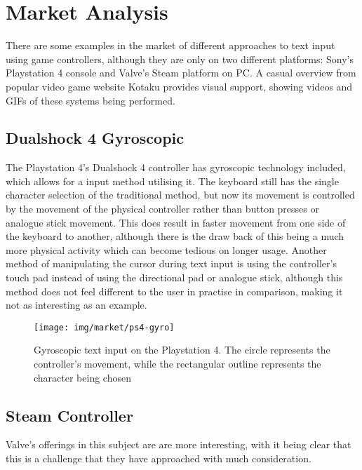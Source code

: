\documentclass[requirements.tex]{subfiles}
\begin{document}
\section{Market Analysis} %
\label{sec:market_analysis}

There are some examples in the market of different approaches to text input
using game controllers, although they are only on two different platforms:
Sony's Playstation 4 console and Valve's Steam platform on PC. A casual overview
from popular video game website Kotaku \cite{Kotaku} provides visual support,
showing videos and GIFs of these systems being performed.

\subsection{Dualshock 4 Gyroscopic} %
\label{sub:dualshock_4_gyroscopic}
The Playstation 4's Dualshock 4 controller has gyroscopic technology included,
which allows for a input method utilising it. The keyboard still has the single
character selection of the traditional method, but now its movement is
controlled by the movement of the physical controller rather than button presses
or analogue stick movement. This does result in faster movement from one side of
the keyboard to another, although there is the draw back of this being a much
more physical activity which can become tedious on longer usage. Another method
of manipulating the cursor during text input is using the controller's touch pad
instead of using the directional pad or analogue stick, although this method
does not feel different to the user in practise in comparison, making it not as
interesting as an example.

\begin{figure}[H]
	\centering
	\texttt{[image: img/market/ps4-gyro]}
	\caption{Gyroscopic text input on the Playstation 4. The circle represents
	the controller's movement, while the rectangular outline represents the
	character being chosen}
\end{figure}

\subsection{Steam Controller} %
\label{sub:steam_controller}
Valve's offerings in this subject are are more interesting, with it being clear
that this is a challenge that they have approached with much consideration.
\end{document}
